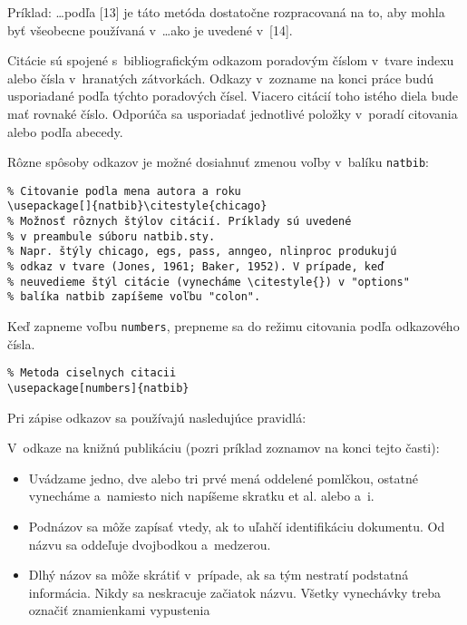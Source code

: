 \medskip

Príklad:
\dots podľa [13] je táto metóda dostatočne rozpracovaná na to, aby
mohla byť\/ všeobecne používaná v~\dots ako je uvedené v~[14].

\medskip

Citácie sú spojené s~bibliografickým odkazom poradovým číslom v~tvare
indexu alebo čísla v~hranatých zátvorkách. Odkazy v~zozname na konci
práce budú usporiadané podľa týchto poradových čísel. Viacero citácií
toho istého diela bude mať\/ rovnaké číslo. Odporúča sa usporiadať\/
jednotlivé položky v~poradí citovania alebo podľa abecedy.

\medskip
\noindent
Rôzne spôsoby odkazov je možné dosiahnuť\/ zmenou voľby v~balíku
\verb+natbib+:

\noindent
\verb+% Citovanie podla mena autora a roku+\\
\verb+\usepackage[]{natbib}\citestyle{chicago}+\\
\verb+% Možnosť rôznych štýlov citácií. Príklady sú uvedené+\\
\verb+% v preambule súboru natbib.sty.+\\
\verb+% Napr. štýly chicago, egs, pass, anngeo, nlinproc produkujú+\\
\verb+% odkaz v tvare (Jones, 1961; Baker, 1952). V prípade, keď+\\
\verb+% neuvedieme štýl citácie (vynecháme \citestyle{}) v "options"+\\
\verb+% balíka natbib zapíšeme voľbu "colon".+

\medskip
\noindent
Keď zapneme voľbu \verb+numbers+, prepneme sa do režimu citovania
podľa odkazového čísla.

\noindent
\verb+% Metoda ciselnych citacii+\\
\verb+\usepackage[numbers]{natbib}+

\bigskip

Pri zápise odkazov sa používajú nasledujúce pravidlá:

V~odkaze na knižnú publikáciu (pozri príklad zoznamov na konci tejto
časti):
\begin{itemize}
\item Uvádzame jedno, dve alebo tri prvé mená oddelené pomlčkou,
ostatné vynecháme a~namiesto nich napíšeme skratku et al. alebo a~i.
\item Podnázov sa môže zapísať\/ vtedy, ak to uľahčí identifikáciu
dokumentu. Od názvu sa oddeľuje dvojbodkou a~medzerou.
\item Dlhý názov sa môže skrátiť\/ v~prípade, ak sa tým nestratí
podstatná informácia. Nikdy sa neskracuje začiatok názvu. Všetky
vynechávky treba označiť\/ znamienkami vypustenia  \uv{\dots}
\end{itemize}

